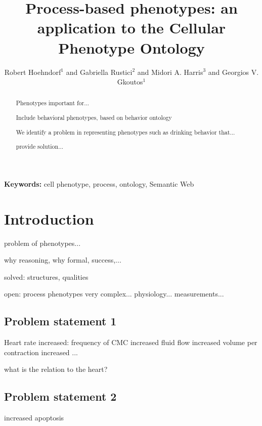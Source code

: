 \documentclass{bioinfo}
\begin{document}

\title{Process-based phenotypes: an application to the Cellular
  Phenotype Ontology}

\author[Hoehndorf et al.]{Robert Hoehndorf$^1$ and Gabriella
  Rustici$^2$ and Midori A. Harris$^3$ and Georgios V. Gkoutos$^{1}$}

\address{$^{1}$Department of Genetics, University of Cambridge,
  Downing Street, Cambridge, Cambridge CB2 3EH, UK\\
  $^{2}$EBI, Wellcome Trust Genome Campus, Hinxton, Cambridge,
  Cambridge CB10 1SD, UK\\
  $^{3}$Department of Biochemistry; University of Cambridge, 80 Tennis
  Court Road, Cambridge CB2 1GA, UK}

\maketitle
 
\begin{abstract}
  Phenotypes important for...

  Include behavioral phenotypes, based on behavior ontology

  We identify a problem in representing phenotypes such as drinking
  behavior that...

  provide solution...
\end{abstract}

{\bf Keywords:} cell phenotype, process, ontology, Semantic Web

\section{Introduction}

problem of phenotypes...

why reasoning, why formal, success,...

solved: structures, qualities

open: process phenotypes very complex...  
physiology...
measurements...

\subsection{Problem statement 1}
Heart rate increased: frequency of CMC increased fluid flow increased
volume per contraction increased ...

what is the relation to the heart?


\subsection{Problem statement 2}
increased apoptosis
\end{document}
